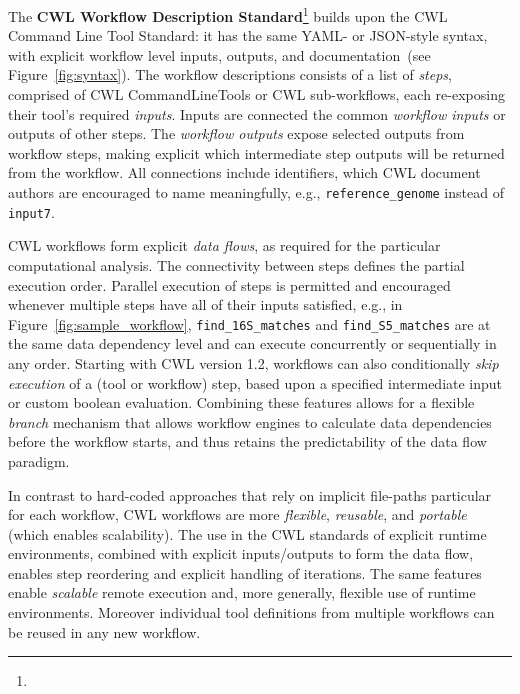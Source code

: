 \documentclass[sigconf,authordraft]{acmart}
\begin{document}
The \textbf{CWL Workflow Description Standard}\footnote{} builds upon the CWL Command Line Tool Standard: it has the same YAML- or JSON-style syntax, with explicit workflow level inputs, outputs, and documentation~(see Figure~\ref{fig:syntax}). The workflow descriptions consists of a list of \textit{steps}, comprised of CWL CommandLineTools or CWL sub-workflows, each re-exposing their tool's required \textit{inputs}. Inputs  are connected  the common \textit{workflow inputs} or  outputs of other steps. The \textit{workflow outputs} expose selected outputs from workflow steps, making explicit which intermediate step outputs will be returned from the workflow. All connections include identifiers, which CWL document authors are encouraged to name meaningfully, e.g., \texttt{reference\_genome} instead of \texttt{input7}.

CWL workflows form explicit \textit{data flows}, as required for the particular computational analysis. The connectivity between steps defines the partial execution order. Parallel execution of steps is permitted and encouraged whenever multiple steps have all of their inputs satisfied, e.g., in Figure~\ref{fig:sample_workflow}, \texttt{find\_16S\_matches} and \texttt{find\_S5\_matches} are at the same data dependency level and can execute concurrently or sequentially in any order.   Starting with CWL version 1.2, workflows can also conditionally \textit{skip execution} of a (tool or workflow) step, based upon a specified intermediate input or custom boolean evaluation. Combining these features allows for a flexible \textit{branch} mechanism that allows workflow engines to calculate data dependencies before the workflow starts, and thus retains the predictability of the data flow paradigm.

In contrast to hard-coded approaches that rely on implicit file-paths particular for each workflow, CWL workflows are more \textit{flexible}, \textit{reusable}, and \textit{portable} (which enables scalability). The use in the CWL standards of explicit runtime environments, combined with explicit inputs/outputs to form the data flow, enables step reordering and explicit handling of iterations. The same features enable \textit{scalable} remote execution and, more generally, flexible use of runtime environments. Moreover\addition{,} individual tool definitions from multiple workflows can be reused in any new workflow. 
\end{document}
